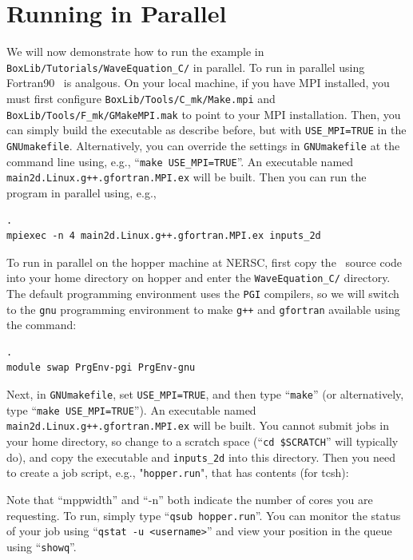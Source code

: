 \section{Running in Parallel}
We will now demonstrate how to run the example in {\tt BoxLib/Tutorials/WaveEquation\_C/}
in parallel.  To run in parallel using Fortran90 \BoxLib\ is analgous.
On your local machine, if you have MPI installed, you must first configure
{\tt BoxLib/Tools/C\_mk/Make.mpi} and {\tt BoxLib/Tools/F\_mk/GMakeMPI.mak} to point 
to your MPI installation.  Then, you 
can simply build the executable as describe before, but with {\tt USE\_MPI=TRUE} 
in the {\tt GNUmakefile}.  Alternatively, you can override the settings in 
{\tt GNUmakefile} at the command line using, e.g., ``{\tt make USE\_MPI=TRUE}''.  
An executable named {\tt main2d.Linux.g++.gfortran.MPI.ex} will be built.
Then you can run the program in parallel using, e.g.,
\begin{lstlisting}[backgroundcolor=\color{light-red}].
mpiexec -n 4 main2d.Linux.g++.gfortran.MPI.ex inputs_2d
\end{lstlisting}

To run in parallel on the hopper machine at NERSC, first copy the \BoxLib\ source code
into your home directory on hopper and enter the {\tt WaveEquation\_C/} directory.
The default programming environment uses the {\tt PGI} compilers, so we will switch to the
{\tt gnu} programming environment to make {\tt g++} and {\tt gfortran} available
using the command:
\begin{lstlisting}[backgroundcolor=\color{light-red}].
module swap PrgEnv-pgi PrgEnv-gnu
\end{lstlisting}
Next, in {\tt GNUmakefile}, set {\tt USE\_MPI=TRUE}, and then type ``{\tt make}''
(or alternatively, type ``{\tt make USE\_MPI=TRUE}'').
An executable named {\tt main2d.Linux.g++.gfortran.MPI.ex} will be built.
You cannot submit jobs in your home directory, so change to a scratch space
(``{\tt cd \$SCRATCH}'' will typically do), and copy the executable and
{\tt inputs\_2d} into this directory.  Then you need to create a job script,
e.g., "{\tt hopper.run}", that has contents (for tcsh):

Note that ``mppwidth'' and ``-n'' both indicate the number of cores you are requesting.
To run, simply type ``{\tt qsub hopper.run}''.  You can monitor the status of your job
using ``{\tt qstat -u <username>}'' and view your position in the queue 
using ``{\tt showq}''.

